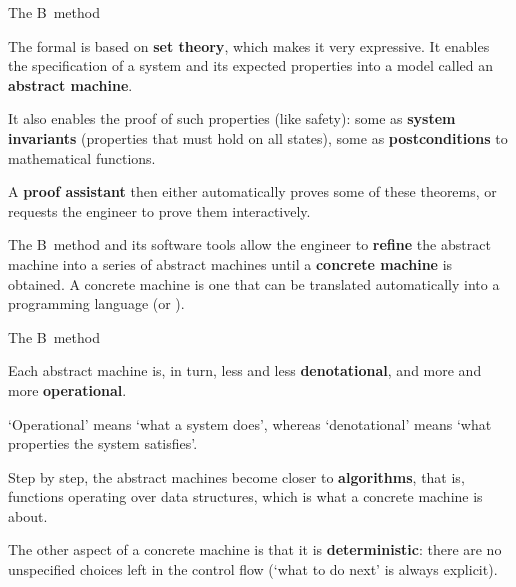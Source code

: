 \documentclass[compress,dvips,xcolor={dvipsnames},t]{beamer}
\begin{document}
%
\begin{frame}{The B~method}

  The formal \textbf{\Blang} is based on \textbf{set theory}, which
  makes it very expressive. It enables the specification of a system
  and its expected properties into a model called an \textbf{abstract
    machine}.

  \bigskip

  It also enables the proof of such properties (like safety): some as
  \textbf{system invariants} (properties that must hold on all
  states), some as \textbf{postconditions} to mathematical functions.

  \bigskip

  A \textbf{proof assistant} then either automatically proves some of
  these theorems, or requests the engineer to prove them
  interactively.

  \bigskip

  The B~method and its software tools allow the engineer to
  \textbf{refine} the abstract machine into a series of abstract
  machines until a \textbf{concrete machine} is obtained. A concrete
  machine is one that can be translated automatically into a
  programming language (\Clang or \Ada).

\end{frame}

%
\begin{frame}{The B~method}

  Each abstract machine is, in turn, less and less
  \textbf{denotational}, and more and more \textbf{operational}.

  \bigskip

   `Operational' means `what a system does', whereas `denotational'
  means `what properties the system satisfies'.

  \bigskip

  Step by step, the abstract machines become closer to
  \textbf{algorithms}, that is, functions operating over data
  structures, which is what a concrete machine is about.

  \bigskip

  The other aspect of a concrete machine is that it is
  \textbf{deterministic}: there are no unspecified choices left in the
  control flow (`what to do next' is always explicit).

\end{frame}
\end{document}
